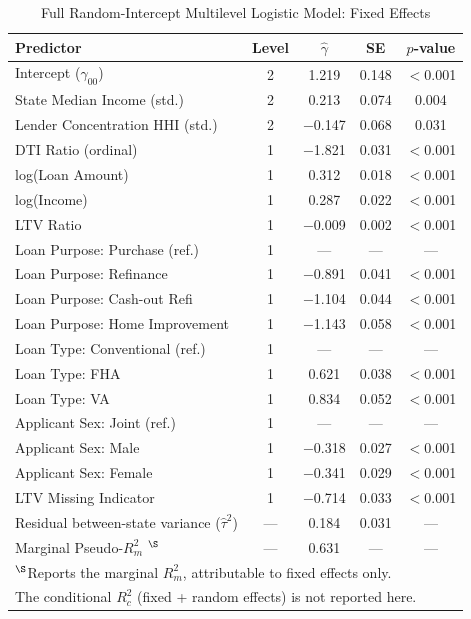 \documentclass[12pt,letterpaper]{article}
\begin{document}
\begin{table}[H]
\centering
\caption{Full Random-Intercept Multilevel Logistic Model: Fixed Effects}
\label{tab:multilevel_full}
\begin{tabular}{lcccc}
\toprule
\textbf{Predictor} & \textbf{Level} & $\hat{\gamma}$ & \textbf{SE} & $p$-value \\
\midrule
Intercept ($\gamma_{00}$) & 2 & 1.219 & 0.148 & $<$0.001 \\
State Median Income (std.) & 2 & 0.213 & 0.074 & 0.004 \\
Lender Concentration HHI (std.) & 2 & $-$0.147 & 0.068 & 0.031 \\
\midrule
DTI Ratio (ordinal) & 1 & $-$1.821 & 0.031 & $<$0.001 \\
log(Loan Amount) & 1 & 0.312 & 0.018 & $<$0.001 \\
log(Income) & 1 & 0.287 & 0.022 & $<$0.001 \\
LTV Ratio & 1 & $-$0.009 & 0.002 & $<$0.001 \\
Loan Purpose: Purchase (ref.) & 1 & --- & --- & --- \\
Loan Purpose: Refinance & 1 & $-$0.891 & 0.041 & $<$0.001 \\
Loan Purpose: Cash-out Refi & 1 & $-$1.104 & 0.044 & $<$0.001 \\
Loan Purpose: Home Improvement & 1 & $-$1.143 & 0.058 & $<$0.001 \\
Loan Type: Conventional (ref.) & 1 & --- & --- & --- \\
Loan Type: FHA & 1 & 0.621 & 0.038 & $<$0.001 \\
Loan Type: VA & 1 & 0.834 & 0.052 & $<$0.001 \\
Applicant Sex: Joint (ref.) & 1 & --- & --- & --- \\
Applicant Sex: Male & 1 & $-$0.318 & 0.027 & $<$0.001 \\
Applicant Sex: Female & 1 & $-$0.341 & 0.029 & $<$0.001 \\
LTV Missing Indicator & 1 & $-$0.714 & 0.033 & $<$0.001 \\
\midrule
Residual between-state variance ($\hat{\tau}^2$) & --- & 0.184 & 0.031 & --- \\
Marginal Pseudo-$R^2_{m}$ \citep{nakagawa2013}$^{\S}$ & --- & 0.631 & --- & --- \\
\bottomrule
\multicolumn{5}{l}{\footnotesize $^{\S}$Reports the marginal $R^2_m$, attributable to fixed effects only.} \\
\multicolumn{5}{l}{\footnotesize The conditional $R^2_c$ (fixed + random effects) is not reported here.} \\
\end{tabular}
\end{table}
\end{document}
